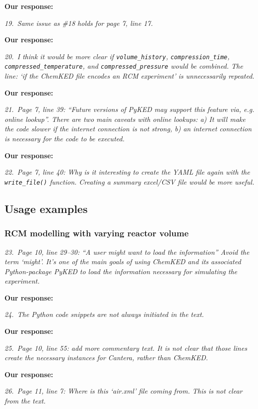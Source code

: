 \documentclass[a4paper,10pt]{elsarticle}
\begin{document}
\textbf{Our response:}


\textit{19.~Same issue as \#18 holds for page 7, line 17.}

\textbf{Our response:}


\textit{20.~I think it would be more clear if \texttt{volume\_history}, \texttt{compression\_time}, \texttt{compressed\_temperature},
and \texttt{compressed\_pressure} would be combined. The line: `if the ChemKED file encodes an
RCM experiment' is unnecessarily repeated.}

\textbf{Our response:}


\textit{21.~Page 7, line 39: ``Future versions of PyKED may support this feature via, e.g. online lookup''.
There are two main caveats with online lookups: a) It will make the code slower if the internet
connection is not strong, b) an internet connection is necessary for the code to be executed.}

\textbf{Our response:}


\textit{22.~Page 7, line 40: Why is it interesting to create the YAML file again with the \texttt{write\_file()} function.
Creating a summary excel/CSV file would be more useful.}


\subsection*{Usage examples}
\subsubsection*{RCM modelling with varying reactor volume}

\textit{23.~Page 10, line 29--30: ``A user might want to load the information'' Avoid the term `might'. It's one of the main goals of using ChemKED and its associated Python-package PyKED to load the information necessary for simulating the experiment.}

\textbf{Our response:}


\textit{24.~The Python code snippets are not always initiated in the text.}

\textbf{Our response:}


\textit{25.~Page 10, line 55: add more commentary text. It is not clear that those lines create the
necessary instances for Cantera, rather than ChemKED.}

\textbf{Our response:}


\textit{26.~Page 11, line 7: Where is this `air.xml' file coming from. This is not clear from the text.}
\end{document}
